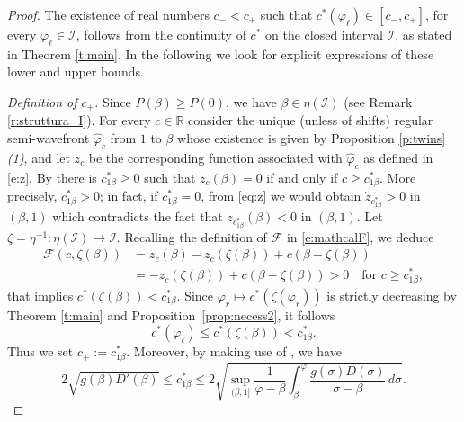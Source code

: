 \documentclass[11pt,a4paper]{article}
\renewcommand{\phi}{\varphi}
\begin{document}
\begin{proof} The existence of real numbers $c_{-}<c_{+}$ such that $c^*(\varphi_\ell) \in [c_-,c_+]$, for every $\varphi_\ell \in \mathcal I$, follows from the continuity of $c^*$ on the closed interval $\mathcal I$, as stated in Theorem \ref{t:main}. In the following we look for explicit expressions of these lower and upper bounds. 

\medskip
{\em Definition of $c_{+}$.} 
Since $P(\beta)\ge P(0)$, we have $\beta \in \eta(\mathcal I)$ (see Remark \ref{r:struttura_I}). For every $c\in \mathbb{R}$ consider the unique (unless of shifts)  regular semi-wavefront $\hat \phi_c$ from $1$ to $\beta$ whose existence is given by Proposition \ref{p:twins}{\em (1)}, and let $z_c$ be the corresponding function associated with $\hat \phi_c$ as defined in \eqref{e:z}.  By  \cite[Proposition 3  (2.11)]{BCM2} there is $c_{1\beta}^*\ge 0$ such that $z_c(\beta)=0$ if and only if $c \ge c^*_{1\beta}$. More precisely, $c_{1\beta}^*>0$; in fact, if $c_{1\beta}^*=0$, from \eqref{eq:z} we would obtain $\dot z_{c_{1\beta}^*}>0$ in $(\beta, 1)$ which contradicts the fact that $z_{c_{1\beta}^*}(\beta)<0$ in $(\beta, 1)$. Let $\zeta=\eta^{-1}:\eta(\mathcal I)\to \mathcal I$. Recalling the definition of $\mathcal{F}$ in \eqref{e:mathcalF}, we deduce
\[
\begin{aligned}
\mathcal F\left(c, \zeta(\beta)\right)&=z_c(\beta)-z_c\left(\zeta(\beta)\right)+c\left(\beta-\zeta(\beta)\right)
\\
&=
-z_c\left(\zeta(\beta)\right)+c\left(\beta-\zeta(\beta)\right) >0 
\quad \text{for } c\ge c^*_{1\beta},
\end{aligned}
\]
that implies $c^*\left(\zeta(\beta)\right)<c^*_{1\beta}$.  Since $\varphi_r\mapsto c^*\left(\zeta(\varphi_r)\right)$ is strictly decreasing by Theorem \ref{t:main} and Proposition~\ref{prop:necess2}, it follows
\[
c^*(\varphi_\ell) \le c^*\left(\zeta(\beta)\right) < c^*_{1\beta}.
\]
Thus we set $c_{+}:=c^*_{1\beta}$. Moreover, by making use of \cite[Corollary 4.1 and Remark 4.1]{BCM3}, we have
\begin{equation}
\label{e:est_c2}
2\sqrt{g(\beta)D'(\beta)} \le c_{1\beta}^*\le 2\sqrt{\sup_{(\beta,1]}\frac{1}{\phi -\beta}\int_{\beta}^{\phi}\frac{g(\sigma)D(\sigma)}{\sigma-\beta}\, d\sigma}.
\end{equation}



\end{proof}
\end{document}
